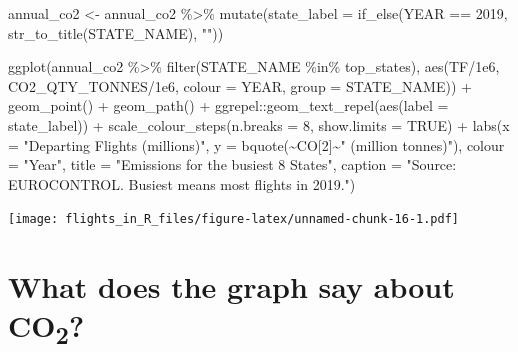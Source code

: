 \documentclass[
]{book}
\newenvironment{Shaded}{\begin{snugshade}}{\end{snugshade}}
\newcommand{\AttributeTok}[1]{\textcolor[rgb]{0.77,0.63,0.00}{#1}}
\newcommand{\ConstantTok}[1]{\textcolor[rgb]{0.00,0.00,0.00}{#1}}
\newcommand{\DecValTok}[1]{\textcolor[rgb]{0.00,0.00,0.81}{#1}}
\newcommand{\FloatTok}[1]{\textcolor[rgb]{0.00,0.00,0.81}{#1}}
\newcommand{\FunctionTok}[1]{\textcolor[rgb]{0.00,0.00,0.00}{#1}}
\newcommand{\NormalTok}[1]{#1}
\newcommand{\OtherTok}[1]{\textcolor[rgb]{0.56,0.35,0.01}{#1}}
\newcommand{\SpecialCharTok}[1]{\textcolor[rgb]{0.00,0.00,0.00}{#1}}
\newcommand{\StringTok}[1]{\textcolor[rgb]{0.31,0.60,0.02}{#1}}
\begin{document}
\begin{Shaded}
\begin{Highlighting}[]
\NormalTok{annual\_co2 }\OtherTok{\textless{}{-}}\NormalTok{ annual\_co2 }\SpecialCharTok{\%\textgreater{}\%} 
  \FunctionTok{mutate}\NormalTok{(}\AttributeTok{state\_label =} \FunctionTok{if\_else}\NormalTok{(YEAR }\SpecialCharTok{==} \DecValTok{2019}\NormalTok{, }\FunctionTok{str\_to\_title}\NormalTok{(STATE\_NAME), }\StringTok{""}\NormalTok{))}

\FunctionTok{ggplot}\NormalTok{(annual\_co2 }\SpecialCharTok{\%\textgreater{}\%} 
         \FunctionTok{filter}\NormalTok{(STATE\_NAME }\SpecialCharTok{\%in\%}\NormalTok{ top\_states), }
       \FunctionTok{aes}\NormalTok{(TF}\SpecialCharTok{/}\FloatTok{1e6}\NormalTok{, CO2\_QTY\_TONNES}\SpecialCharTok{/}\FloatTok{1e6}\NormalTok{, }
           \AttributeTok{colour =}\NormalTok{ YEAR, }\AttributeTok{group =}\NormalTok{ STATE\_NAME)) }\SpecialCharTok{+}
  \FunctionTok{geom\_point}\NormalTok{() }\SpecialCharTok{+} 
  \FunctionTok{geom\_path}\NormalTok{() }\SpecialCharTok{+}
\NormalTok{  ggrepel}\SpecialCharTok{::}\FunctionTok{geom\_text\_repel}\NormalTok{(}\FunctionTok{aes}\NormalTok{(}\AttributeTok{label =}\NormalTok{ state\_label)) }\SpecialCharTok{+}
  \FunctionTok{scale\_colour\_steps}\NormalTok{(}\AttributeTok{n.breaks =} \DecValTok{8}\NormalTok{, }\AttributeTok{show.limits =} \ConstantTok{TRUE}\NormalTok{) }\SpecialCharTok{+}
  \FunctionTok{labs}\NormalTok{(}\AttributeTok{x =} \StringTok{"Departing Flights (millions)"}\NormalTok{, }
       \AttributeTok{y =} \FunctionTok{bquote}\NormalTok{(}\SpecialCharTok{\textasciitilde{}}\NormalTok{CO[}\DecValTok{2}\NormalTok{]}\SpecialCharTok{\textasciitilde{}}\StringTok{" (million tonnes)"}\NormalTok{),}
       \AttributeTok{colour =} \StringTok{"Year"}\NormalTok{,}
       \AttributeTok{title =} \StringTok{"Emissions for the busiest 8 States"}\NormalTok{,}
       \AttributeTok{caption =} \StringTok{"Source: EUROCONTROL. \textquotesingle{}Busiest\textquotesingle{} means most flights in 2019."}\NormalTok{)}
\end{Highlighting}
\end{Shaded}

\texttt{[image: flights\_in\_R\_files/figure-latex/unnamed-chunk-16-1.pdf]}

\hypertarget{what-does-the-graph-say-about-co2}{%
\section{\texorpdfstring{What does the graph say about CO\textsubscript{2}?}{What does the graph say about CO2?}}\label{what-does-the-graph-say-about-co2}}
\end{document}
